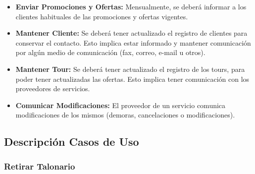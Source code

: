\documentclass[12pt,a4paper]{article}
\begin{document}
\begin{itemize}
			\item \textbf{Enviar Promociones y Ofertas:} Mensualmente, se deberá informar a los clientes habituales de las promociones y ofertas vigentes.

			\item \textbf{Mantener Cliente:} Se deberá tener actualizado el registro de clientes para conservar el contacto. Esto implica estar informado y mantener comunicación por algún medio de comunicación (fax, correo, e-mail u otros). 

			\item \textbf{Mantener Tour:} Se deberá tener actualizado el registro de los tours, para poder tener actualizadas las ofertas. Esto implica tener comunicación con los proveedores de servicios.

			\item \textbf{Comunicar Modificaciones:} El proveedor de un servicio comunica modificaciones de los mismos (demoras, cancelaciones o modificaciones).
		\end{itemize}

	\subsection{Descripción Casos de Uso}
		\subsubsection{Retirar Talonario}
			
\end{document}
